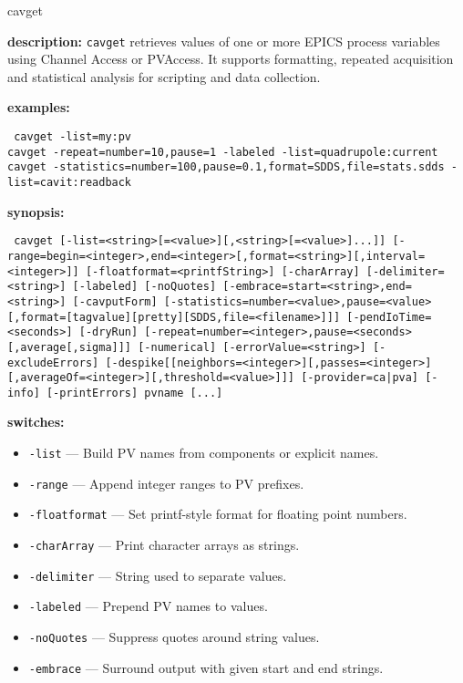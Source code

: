 %
%
\begin{sddsprog}{cavget}
\item {\bf description:}
\verb+cavget+ retrieves values of one or more EPICS process variables using Channel Access or PVAccess.
It supports formatting, repeated acquisition and statistical analysis for scripting and data collection.
\item {\bf examples:}
\begin{flushleft}{\tt
cavget -list=my:pv\\
cavget -repeat=number=10,pause=1 -labeled -list=quadrupole:current\\
cavget -statistics=number=100,pause=0.1,format=SDDS,file=stats.sdds -list=cavit:readback
}\end{flushleft}
\item {\bf synopsis:}
\begin{flushleft}{\tt
cavget [-list=<string>[=<value>][,<string>[=<value>]...]]\
[-range=begin=<integer>,end=<integer>[,format=<string>][,interval=<integer>]]\
[-floatformat=<printfString>] [-charArray] [-delimiter=<string>] [-labeled]\
[-noQuotes] [-embrace=start=<string>,end=<string>] [-cavputForm]\
[-statistics=number=<value>,pause=<value>[,format=[tagvalue][pretty][SDDS,file=<filename>]]]\
[-pendIoTime=<seconds>] [-dryRun] [-repeat=number=<integer>,pause=<seconds>[,average[,sigma]]]\
[-numerical] [-errorValue=<string>] [-excludeErrors]\
[-despike[[neighbors=<integer>][,passes=<integer>][,averageOf=<integer>][,threshold=<value>]]]\
[-provider={ca|pva}] [-info] [-printErrors] pvname [...]
}\end{flushleft}
\item {\bf switches:}
  \begin{itemize}
    \item {\tt -list} --- Build PV names from components or explicit names.
    \item {\tt -range} --- Append integer ranges to PV prefixes.
    \item {\tt -floatformat} --- Set printf-style format for floating point numbers.
    \item {\tt -charArray} --- Print character arrays as strings.
    \item {\tt -delimiter} --- String used to separate values.
    \item {\tt -labeled} --- Prepend PV names to values.
    \item {\tt -noQuotes} --- Suppress quotes around string values.
    \item {\tt -embrace} --- Surround output with given start and end strings.

\end{itemize}
\end{sddsprog}
